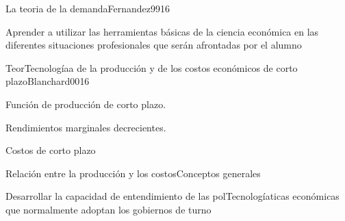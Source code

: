 \begin{syllabus}
\begin{unit}{La teoria de la demanda}{Fernandez99}{16}
\begin{unitgoals}
      \item Aprender a utilizar las herramientas básicas de la ciencia económica en las diferentes situaciones profesionales que serán afrontadas por el alumno
   \end{unitgoals}
\end{unit}


\begin{unit}{TeorTecnologíaa de la producción y de los costos económicos de corto plazo}{Blanchard00}{16}
\begin{topics}
	\item Función de producción de corto plazo.
	\item Rendimientos marginales decrecientes.
	\item Costos de corto plazo
	\item Relación entre la producción y los costosConceptos generales
\end{topics}

\begin{unitgoals}
      \item Desarrollar la capacidad de entendimiento de las polTecnologíaticas económicas que normalmente adoptan los gobiernos de turno
   \end{unitgoals}
\end{unit}

\begin{coursebibliography}
\end{coursebibliography}
\end{syllabus}





